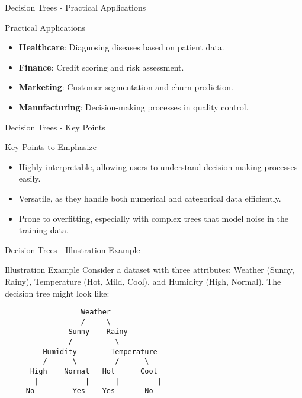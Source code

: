 \documentclass[aspectratio=169]{beamer}
\begin{document}
\begin{frame}[fragile]{Decision Trees - Practical Applications}
    \begin{block}{Practical Applications}
        \begin{itemize}
            \item \textbf{Healthcare}: Diagnosing diseases based on patient data.
            \item \textbf{Finance}: Credit scoring and risk assessment.
            \item \textbf{Marketing}: Customer segmentation and churn prediction.
            \item \textbf{Manufacturing}: Decision-making processes in quality control.
        \end{itemize}
    \end{block}
\end{frame}

\begin{frame}[fragile]{Decision Trees - Key Points}
    \begin{block}{Key Points to Emphasize}
        \begin{itemize}
            \item Highly interpretable, allowing users to understand decision-making processes easily.
            \item Versatile, as they handle both numerical and categorical data efficiently.
            \item Prone to overfitting, especially with complex trees that model noise in the training data.
        \end{itemize}
    \end{block}
\end{frame}

\begin{frame}[fragile]{Decision Trees - Illustration Example}
    \begin{block}{Illustration Example}
        Consider a dataset with three attributes: Weather (Sunny, Rainy), Temperature (Hot, Mild, Cool), and Humidity (High, Normal). The decision tree might look like:
    
        \begin{verbatim}
                  Weather
                  /     \
               Sunny    Rainy
               /          \
         Humidity        Temperature
         /      \         /      \
      High    Normal   Hot      Cool
       |           |      |         |
     No         Yes    Yes       No
        \end{verbatim}
    \end{block}
\end{frame}
\end{document}
